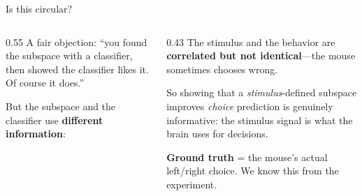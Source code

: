 \documentclass[aspectratio=169,11pt]{beamer}
\begin{document}
\begin{frame}{Is this circular?}
\begin{columns}[T]
\begin{column}{0.55\textwidth}
{\small A fair objection: ``you found the subspace with a classifier, then showed the classifier likes it. Of course it does.''}

\vspace{0.5em}
{\small But the subspace and the classifier use \textbf{different information}:}

\vspace{0.3em}

\end{column}
\begin{column}{0.43\textwidth}
\vspace{0.5em}
{\small The stimulus and the behavior are \textbf{correlated but not identical}---the mouse sometimes chooses wrong.}

\vspace{0.5em}
{\small So showing that a \emph{stimulus}-defined subspace improves \emph{choice} prediction is genuinely informative: the stimulus signal is what the brain uses for decisions.}

\vspace{0.5em}
{\small \textbf{Ground truth} = the mouse's actual left/right choice. We know this from the experiment.}
\end{column}
\end{columns}
\end{frame}
\end{document}
